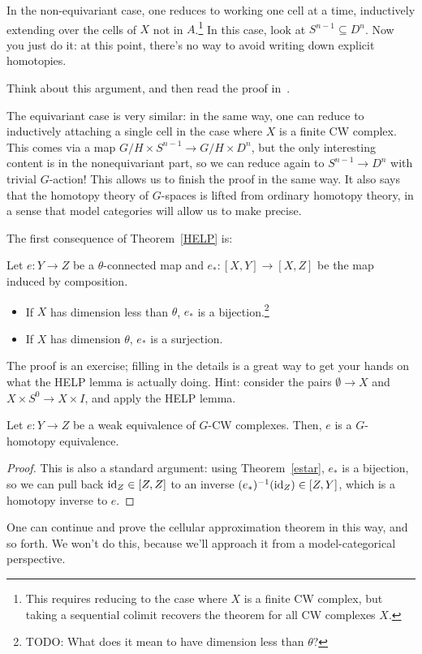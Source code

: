 In the non-equivariant case, one reduces to working one cell at a time, inductively extending over the cells of $X$
not in $A$.\footnote{This requires reducing to the case where $X$ is a finite CW complex, but taking a sequential
colimit recovers the theorem for all CW complexes $X$.} In this case, look at $S^{n-1}\subseteq D^n$. Now you just
do it: at this point, there's no way to avoid writing down explicit homotopies.
\begin{ex}
Think about this argument, and then read the proof in~\cite{ConciseCourse}.
\end{ex}
The equivariant case is very similar: in the same way, one can reduce to inductively attaching a single cell in the
case where $X$ is a finite CW complex. This comes via a map $G/H\times S^{n-1}\to G/H\times D^n$, but the only
interesting content is in the nonequivariant part, so we can reduce again to $S^{n-1}\to D^n$ with trivial
$G$-action! This allows us to finish the proof in the same way. It also says that the homotopy theory of $G$-spaces
is lifted from ordinary homotopy theory, in a sense that model categories will allow us to make precise.

The first consequence of Theorem~\ref{HELP} is:
\begin{thm}
\label{estar}
Let $e:Y\to Z$ be a $\theta$-connected map and $e_*: [X,Y]\to [X,Z]$ be the map induced by composition.
\begin{itemize}
	\item If $X$ has dimension less than $\theta$, $e_*$ is a bijection.\footnote{{\color{red}TODO}: What does it
	mean to have dimension less than $\theta$?}
	\item If $X$ has dimension $\theta$, $e_*$ is a surjection.
\end{itemize}
\end{thm}
The proof is an exercise; filling in the details is a great way to get your hands on what the HELP lemma is
actually doing. Hint: consider the pairs $\emptyset\to X$ and $X\times S^0\to X\times I$, and apply the HELP lemma.
\begin{cor}
\label{eqWhite}
Let $e:Y\to Z$ be a weak equivalence of $G$-CW complexes. Then, $e$ is a $G$-homotopy equivalence.
\end{cor}
\begin{proof}
This is also a standard argument: using Theorem~\ref{estar}, $e_*$ is a bijection, so we can pull back
$\mathrm{id}_Z\in[Z,Z]$ to an inverse $(e_*)^{-1}(\mathrm{id}_Z)\in [Z,Y]$, which is a homotopy inverse to $e$.
\end{proof}
One can continue and prove the cellular approximation theorem in this way, and so forth. We won't do this, because
we'll approach it from a model-categorical perspective.

